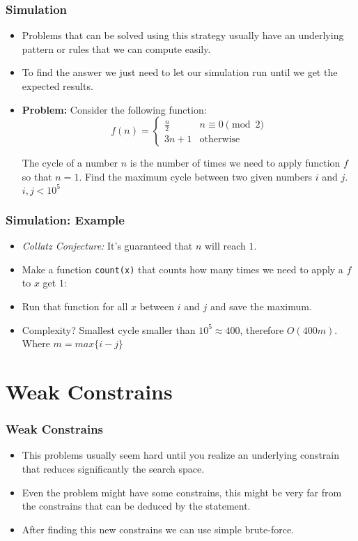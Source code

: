 \documentclass{beamer}
\begin{document}
\begin{frame}
	\frametitle{Simulation}

	\begin{itemize}
		\item Problems that can be solved using this strategy usually have an underlying pattern or rules that we can compute easily.
		\item To find the answer we just need to let our simulation run until we get the expected results.
		\item \textbf{Problem:} Consider the following function:
			$$ f(n) = \begin{cases} \frac{n}{2} & n \equiv 0 \pmod{2}\\
			3n + 1 & \text{otherwise} \end{cases}$$

			The cycle of a number $n$ is the number of times we need to apply function $f$ so that $n = 1$. Find the maximum cycle between two given numbers $i$ and $j$. $i, j < 10^5$
	\end{itemize}
\end{frame}

\begin{frame}
	\frametitle{Simulation: Example}

	\begin{itemize}
		\item \textit{Collatz Conjecture:} It's guaranteed that $n$ will reach $1$.
		\item<2-> Make a function \texttt{count(x)} that counts how many times we need to apply a $f$ to $x$ get $1$:
		\item<3-> Run that function for all $x$ between $i$ and $j$ and save the maximum.
		\item<4-> Complexity? Smallest cycle smaller than $10^{5} \approx 400$, therefore $O(400m)$. Where $m = max\{i - j\}$
	\end{itemize}
\end{frame}

\section{Weak Constrains}

\begin{frame}
	\frametitle{Weak Constrains}

	\begin{itemize}
		\item This problems usually seem hard until you realize an underlying constrain that reduces significantly the search space.
		\item Even the problem might have some constrains, this might be very far from the constrains that can be deduced by the statement.
		\item After finding this new constrains we can use simple brute-force.
	\end{itemize}
\end{frame}
\end{document}
